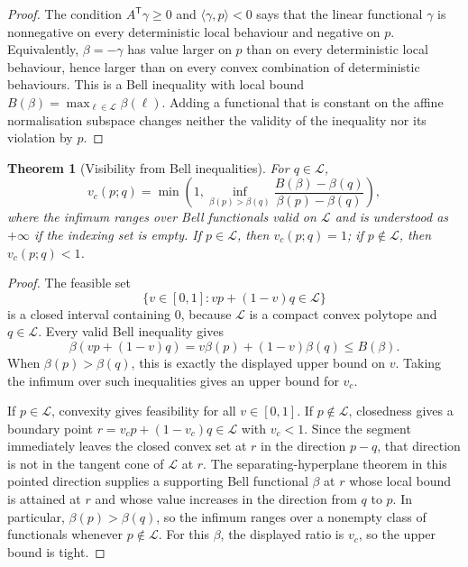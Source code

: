\documentclass[11pt]{article}
\theoremstyle{plain}
\newtheorem{theorem}{Theorem}[section]
\theoremstyle{definition}
\theoremstyle{remark}
\begin{document}
\begin{proof}
The condition \(A^{\mathsf T}\gamma\ge0\) and \(\langle\gamma,p\rangle<0\) says
that the linear functional \(\gamma\) is nonnegative on every deterministic local
behaviour and negative on \(p\). Equivalently, \(\beta=-\gamma\) has value larger
on \(p\) than on every deterministic local behaviour, hence larger than on every
convex combination of deterministic behaviours. This is a Bell inequality with
local bound \(B(\beta)=\max_{\ell\in\mathcal L}\beta(\ell)\). Adding a functional
that is constant on the affine normalisation subspace changes neither the
validity of the inequality nor its violation by \(p\).
\end{proof}

\begin{theorem}[Visibility from Bell inequalities]
\label{thm:visibility-dual}
For \(q\in\mathcal L\),
\[
v_c(p;q)
=
\min\left(
1,
\inf_{\beta(p)>\beta(q)}
\frac{B(\beta)-\beta(q)}{\beta(p)-\beta(q)}
\right),
\]
where the infimum ranges over Bell functionals valid on \(\mathcal L\) and is
understood as \(+\infty\) if the indexing set is empty. If \(p\in\mathcal L\),
then \(v_c(p;q)=1\); if \(p\notin\mathcal L\), then \(v_c(p;q)<1\).
\end{theorem}

\begin{proof}
The feasible set
\[
\{v\in[0,1]:vp+(1-v)q\in\mathcal L\}
\]
is a closed interval containing \(0\), because \(\mathcal L\) is a compact convex
polytope and \(q\in\mathcal L\). Every valid Bell inequality gives
\[
\beta(vp+(1-v)q)
=v\beta(p)+(1-v)\beta(q)
\le B(\beta).
\]
When \(\beta(p)>\beta(q)\), this is exactly the displayed upper bound on \(v\).
Taking the infimum over such inequalities gives an upper bound for \(v_c\).

If \(p\in\mathcal L\), convexity gives feasibility for all \(v\in[0,1]\). If
\(p\notin\mathcal L\), closedness gives a boundary point
\(r=v_c p+(1-v_c)q\in\mathcal L\) with \(v_c<1\). Since the segment immediately
leaves the closed convex set at \(r\) in the direction \(p-q\), that direction is
not in the tangent cone of \(\mathcal L\) at \(r\). The separating-hyperplane
theorem in this pointed direction supplies a supporting Bell functional
\(\beta\) at \(r\) whose local bound is attained at \(r\) and whose value
increases in the direction from \(q\) to \(p\). In particular,
\(\beta(p)>\beta(q)\), so the infimum ranges over a nonempty class of functionals
whenever \(p\notin\mathcal L\). For this \(\beta\), the displayed ratio is
\(v_c\), so the upper bound is tight.
\end{proof}
\end{document}
